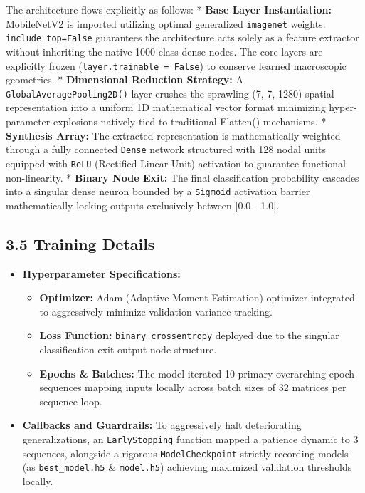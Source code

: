 \documentclass[
]{article}
\providecommand{\tightlist}{%
  \setlength{\itemsep}{0pt}\setlength{\parskip}{0pt}}
\begin{document}
The architecture flows explicitly as follows: * \textbf{Base Layer
Instantiation:} MobileNetV2 is imported utilizing optimal generalized
\texttt{imagenet} weights. \texttt{include\_top=False} guarantees the
architecture acts solely as a feature extractor without inheriting the
native 1000-class dense nodes. The core layers are explicitly frozen
(\texttt{layer.trainable\ =\ False}) to conserve learned macroscopic
geometries. * \textbf{Dimensional Reduction Strategy:} A
\texttt{GlobalAveragePooling2D()} layer crushes the sprawling (7, 7,
1280) spatial representation into a uniform 1D mathematical vector
format minimizing hyper-parameter explosions natively tied to
traditional Flatten() mechanisms. * \textbf{Synthesis Array:} The
extracted representation is mathematically weighted through a fully
connected \texttt{Dense} network structured with 128 nodal units
equipped with \texttt{ReLU} (Rectified Linear Unit) activation to
guarantee functional non-linearity. * \textbf{Binary Node Exit:} The
final classification probability cascades into a singular dense neuron
bounded by a \texttt{Sigmoid} activation barrier mathematically locking
outputs exclusively between {[}0.0 - 1.0{]}.

\subsection{3.5 Training Details}\label{training-details}

\begin{itemize}
\tightlist
\item
  \textbf{Hyperparameter Specifications:}

  \begin{itemize}
  \tightlist
  \item
    \textbf{Optimizer:} Adam (Adaptive Moment Estimation) optimizer
    integrated to aggressively minimize validation variance tracking.
  \item
    \textbf{Loss Function:} \texttt{binary\_crossentropy} deployed due
    to the singular classification exit output node structure.
  \item
    \textbf{Epochs \& Batches:} The model iterated 10 primary
    overarching epoch sequences mapping inputs locally across batch
    sizes of 32 matrices per sequence loop.
  \end{itemize}
\item
  \textbf{Callbacks and Guardrails:} To aggressively halt deteriorating
  generalizations, an \texttt{EarlyStopping} function mapped a patience
  dynamic to 3 sequences, alongside a rigorous \texttt{ModelCheckpoint}
  strictly recording models (as \texttt{best\_model.h5} \&
  \texttt{model.h5}) achieving maximized validation thresholds locally.
\end{itemize}
\end{document}
